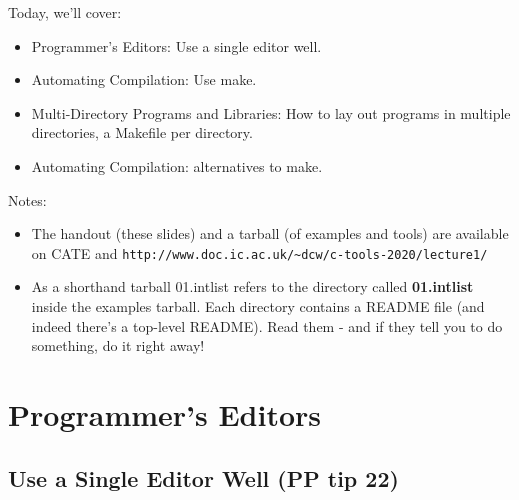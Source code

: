 \documentclass[handout]{beamer}
\begin{document}
\begin{frame}[fragile]
  Today, we'll cover:
      \begin{itemize}
        \item
          \alert{Programmer's Editors:} Use a single editor well.
        \item
	  \alert{Automating Compilation:} Use make.
        \item
   	  \alert{Multi-Directory Programs and Libraries:} How to lay out
	  programs in multiple directories, a Makefile per directory.
        \item
	  \alert{Automating Compilation:} alternatives to make.
	\end{itemize}
    \pause

    Notes:


    \begin{itemize}
    \item
    The handout (these slides) and a tarball (of examples and tools) are available on CATE and
    \verb+http://www.doc.ic.ac.uk/~dcw/c-tools-2020/lecture1/+

    \item
    As a shorthand \alert{tarball 01.intlist} refers to the directory
    called {\bf 01.intlist} inside the examples tarball.
    Each directory contains a README file (and indeed there's a top-level README).
    Read them - and if they tell you to do something, do it right away!
    \end{itemize}

\end{frame}

\section{Programmer's Editors}
\subsection{Use a Single Editor Well (PP tip 22)}
\end{document}
